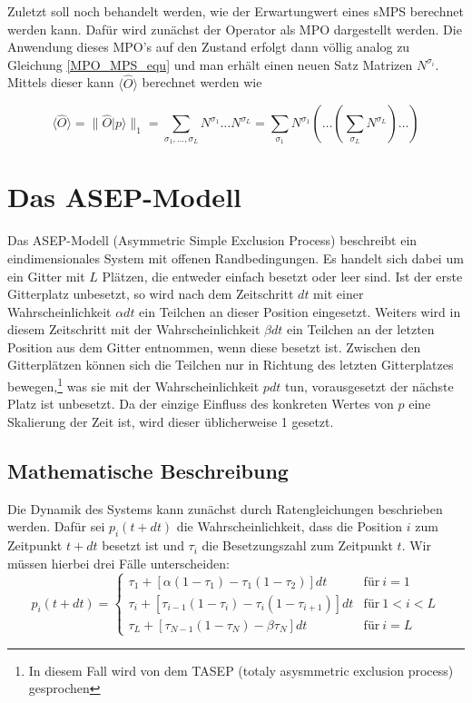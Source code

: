 \documentclass[10pt,a4paper]{report}
\newcommand{\SumIndex}{\sigma_1,\ldots,\sigma_L}
\begin{document}
Zuletzt soll noch behandelt werden, wie der Erwartungwert eines sMPS berechnet werden kann. Dafür wird zunächst der Operator als MPO dargestellt werden. Die Anwendung dieses MPO's auf den Zustand erfolgt dann völlig analog zu Gleichung \ref{MPO_MPS_equ} und man erhält einen neuen Satz Matrizen $N^{\sigma_i}$. Mittels dieser kann $\langle\hat{O}\rangle$ berechnet werden wie

\begin{equation}
\langle\hat{O}\rangle=\parallel \hat{O}|p\rangle\parallel_1=\sum_{\SumIndex}N^{\sigma_1}\ldots N^{\sigma_L}=\sum_{\sigma_1}N^{\sigma_1}(\ldots(\sum_{\sigma_L}N^{\sigma_L})\ldots)
\end{equation}




\chapter{Das ASEP-Modell}
Das ASEP-Modell (Asymmetric Simple Exclusion Process) beschreibt ein eindimensionales System mit offenen Randbedingungen. Es handelt sich dabei um ein Gitter mit $L$ Plätzen, die entweder einfach besetzt oder leer sind. Ist der erste Gitterplatz unbesetzt, so wird nach dem Zeitschritt $dt$ mit einer Wahrscheinlichkeit $\alpha dt$ ein Teilchen an dieser Position eingesetzt. Weiters wird in diesem Zeitschritt mit der Wahrscheinlichkeit $\beta dt$ ein Teilchen an der letzten Position aus dem Gitter entnommen, wenn diese besetzt ist. Zwischen den Gitterplätzen können sich die Teilchen nur in Richtung des letzten Gitterplatzes bewegen,\footnote{In diesem Fall wird von dem TASEP (totaly asysmmetric exclusion process) gesprochen} was sie mit der Wahrscheinlichkeit $pdt$ tun, vorausgesetzt der nächste Platz ist unbesetzt. Da der einzige Einfluss des konkreten Wertes von $p$ eine Skalierung der Zeit ist, wird  dieser üblicherweise 1 gesetzt.\\

\section{Mathematische Beschreibung}
Die Dynamik des Systems kann zunächst durch Ratengleichungen beschrieben werden. Dafür sei $p_i(t+dt)$ die Wahrscheinlichkeit, dass die Position $i$ zum Zeitpunkt $t+dt$ besetzt ist und $\tau_i$ die Besetzungszahl zum Zeitpunkt $t$. Wir müssen hierbei drei Fälle unterscheiden:
\begin{equation}\label{rate_equ}
p_i(t+dt)=
\begin{cases}
\tau_1+[\alpha(1-\tau_1)-\tau_1(1-\tau_2)]dt & \text{für}\ i=1\\
\tau_i+[\tau_{i-1}(1-\tau_i)-\tau_i(1-\tau_{i+1})]dt & \text{für}\ 1<i<L\\
\tau_L+[\tau_{N-1}(1-\tau_N)-\beta\tau_N]dt & \text{für}\ i=L
\end{cases}
\end{equation}
\end{document}
